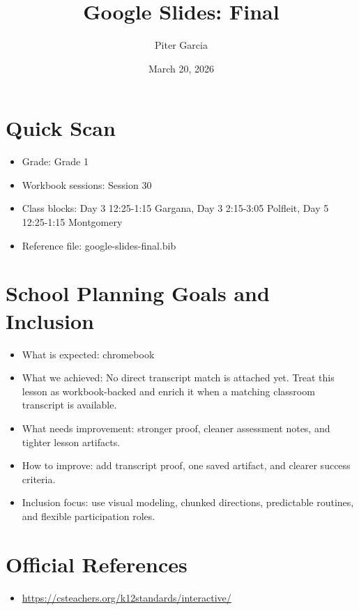 \documentclass[11pt]{article}
\title{Google Slides: Final}
\author{Piter Garcia}
\date{March 20, 2026}
\begin{document}
\maketitle
\section*{Quick Scan}
\begin{itemize}[leftmargin=*]
\item Grade: Grade 1
\item Workbook sessions: Session 30
\item Class blocks: Day 3 12:25-1:15 Gargana, Day 3 2:15-3:05 Polfleit, Day 5 12:25-1:15 Montgomery
\item Reference file: google-slides-final.bib
\end{itemize}
\section*{School Planning Goals and Inclusion}
\begin{itemize}[leftmargin=*]
\item What is expected: chromebook
\item What we achieved: No direct transcript match is attached yet. Treat this lesson as workbook-backed and enrich it when a matching classroom transcript is available.
\item What needs improvement: stronger proof, cleaner assessment notes, and tighter lesson artifacts.
\item How to improve: add transcript proof, one saved artifact, and clearer success criteria.
\item Inclusion focus: use visual modeling, chunked directions, predictable routines, and flexible participation roles.
\end{itemize}
\section*{Official References}
\begin{itemize}[leftmargin=*]
\item \url{https://csteachers.org/k12standards/interactive/}

\end{itemize}
\end{document}
